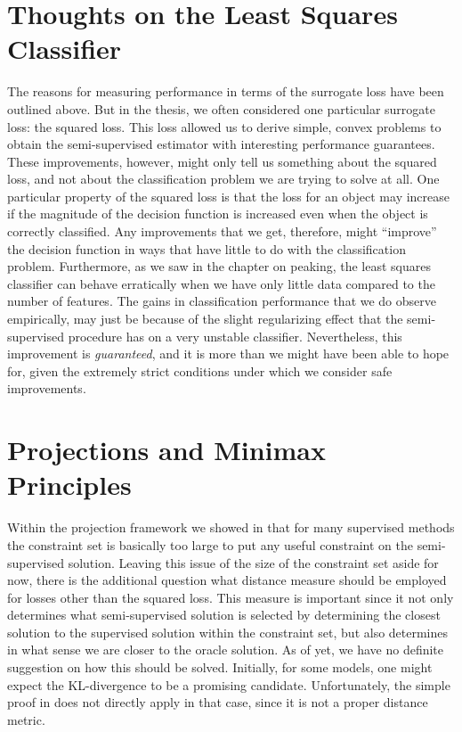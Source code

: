 \documentclass[twoside]{memoir}\usepackage[]{graphicx}\usepackage{xcolor}
\begin{document}
\section{Thoughts on the Least Squares Classifier}
The reasons for measuring performance in terms of the surrogate loss have been outlined above. But in the thesis, we often considered one particular surrogate loss: the squared loss. This loss allowed us to derive simple, convex problems to obtain the semi-supervised estimator with interesting performance guarantees. These improvements, however, might only tell us something about the squared loss, and not about the classification problem we are trying to solve at all. One particular property of the squared loss is that the loss for an object may increase if the magnitude of the decision function is increased even when the object is correctly classified. Any improvements that we get, therefore, might ``improve'' the decision function in ways that have little to do with the classification problem. Furthermore, as we saw in the chapter on peaking, the least squares classifier can behave erratically when we have only little data compared to the number of features. The gains in classification performance that we do observe empirically, may just be because of the slight regularizing effect that the semi-supervised procedure has on a very unstable classifier. Nevertheless, this improvement is \emph{guaranteed}, and it is more than we might have been able to hope for, given the extremely strict conditions under which we consider safe improvements.

\section{Projections and Minimax Principles}
Within the projection framework we showed in  that for many supervised methods the constraint set is basically too large to put any useful constraint on the semi-supervised solution. Leaving this issue of the size of the constraint set aside for now, there is the additional question what distance measure should be employed for losses other than the squared loss. This measure is important since it not only determines what semi-supervised solution is selected by determining the closest solution to the supervised solution within the constraint set, but also determines in what sense we are closer to the oracle solution. As of yet, we have no definite suggestion on how this should be solved. Initially, for some models, one might expect the KL-divergence to be a promising candidate. Unfortunately, the simple proof in  does not directly apply in that case, since it is not a proper distance metric. 
\end{document}
